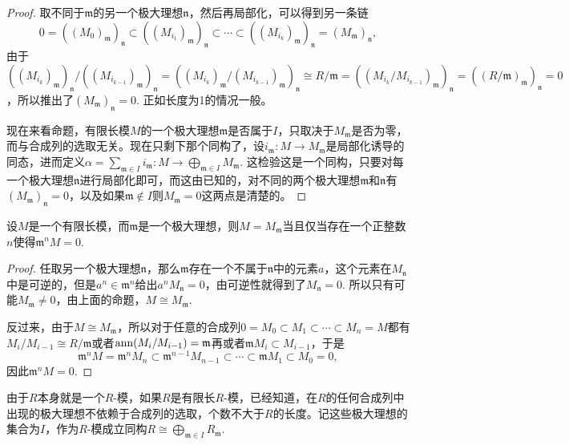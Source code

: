 \begin{proof}
	取不同于$\mathfrak{m}$的另一个极大理想$\mathfrak{n}$，然后再局部化，可以得到另一条链
	\[
	0=((M_0)_\mathfrak{m})_\mathfrak{n}\subset ((M_{i_1})_\mathfrak{m})_\mathfrak{n}\subset \cdots\subset ((M_{i_k})_\mathfrak{m})_\mathfrak{n}=(M_\mathfrak{m})_\mathfrak{n},
	\]
	由于$((M_{i_k})_\mathfrak{m})_\mathfrak{n}/((M_{i_{k-1}})_\mathfrak{m})_\mathfrak{n}=((M_{i_k})_\mathfrak{m}/(M_{i_{k-1}})_\mathfrak{m})_{\mathfrak{n}}\cong R/\mathfrak{m}=((M_{i_k}/M_{i_{k-1}})_\mathfrak{m})_\mathfrak{n}=((R/\mathfrak{m})_{\mathfrak{m}})_\mathfrak{n}=0$，所以推出了$(M_\mathfrak{m})_\mathfrak{n}=0$. 正如长度为1的情况一般。

	现在来看命题，有限长模$M$的一个极大理想$\mathfrak{m}$是否属于$I$，只取决于$M_\mathfrak{m}$是否为零，而与合成列的选取无关。现在只剩下那个同构了，设$i_\mathfrak{m}:M\to M_{\mathfrak{m}}$是局部化诱导的同态，进而定义$\alpha=\sum_{\mathfrak{m}\in I}i_{\mathfrak{m}}:M\to \bigoplus_{\mathfrak{m}\in I} M_{\mathfrak{m}}$. 这检验这是一个同构，只要对每一个极大理想$\mathfrak{n}$进行局部化即可，而这由已知的，对不同的两个极大理想$\mathfrak{m}$和$\mathfrak{n}$有$(M_\mathfrak{m})_\mathfrak{n}=0$，以及如果$\mathfrak{m}\not\in I$则$M_\mathfrak{m}=0$这两点是清楚的。
\end{proof}

\begin{pro}\label{pro:3.4.11}
设$M$是一个有限长模，而$\mathfrak{m}$是一个极大理想，则$M=M_{\mathfrak{m}}$当且仅当存在一个正整数$n$使得$\mathfrak{m}^nM=0$.
\end{pro}

\begin{proof}
	任取另一个极大理想$\mathfrak{n}$，那么$\mathfrak{m}$存在一个不属于$\mathfrak{n}$中的元素$a$，这个元素在$M_\mathfrak{n}$中是可逆的，但是$a^n\in \mathfrak{m}^n$给出$a^nM_\mathfrak{n}=0$，由可逆性就得到了$M_\mathfrak{n}=0$. 所以只有可能$M_\mathfrak{m}\neq 0$，由上面的命题，$M\cong M_\mathfrak{m}$.

	反过来，由于$M\cong M_\mathfrak{m}$，所以对于任意的合成列$0=M_0\subset M_1\subset \cdots\subset M_n=M$都有$M_i/M_{i-1}\cong R/\mathfrak{m}$或者$\operatorname{ann}(M_i/M_{i-1})=\mathfrak{m}$再或者$\mathfrak{m}M_{i}\subset M_{i-1}$，于是
	\[
	\mathfrak{m}^nM=\mathfrak{m}^nM_{n}\subset \mathfrak{m}^{n-1}M_{n-1}\subset \cdots \subset \mathfrak{m}M_1\subset M_0=0,
	\]
	因此$\mathfrak{m}^nM=0$.
\end{proof}

\para 由于$R$本身就是一个$R$-模，如果$R$是有限长$R$-模，已经知道，在$R$的任何合成列中出现的极大理想不依赖于合成列的选取，个数不大于$R$的长度。记这些极大理想的集合为$I$，作为$R$-模成立同构$R\cong\bigoplus_{\mathfrak{m}\in I}R_\mathfrak{m}$.

